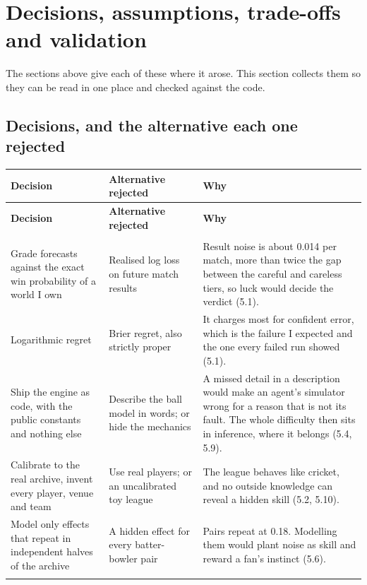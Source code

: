 \documentclass[11pt,letterpaper]{article}
\begin{document}
\section{Decisions, assumptions, trade-offs and validation}

The sections above give each of these where it arose. This section collects them so they can be read in one place and checked against the code.


\subsection{Decisions, and the alternative each one rejected}

\begin{small}
\begin{longtable}{>{\raggedright\arraybackslash}p{}>{\raggedright\arraybackslash}p{}>{\raggedright\arraybackslash}p{}}
\toprule
\textbf{Decision} & \textbf{Alternative rejected} & \textbf{Why} \\ \midrule
\endfirsthead
\toprule
\textbf{Decision} & \textbf{Alternative rejected} & \textbf{Why} \\ \midrule
\endhead
\midrule \multicolumn{3}{r}{\footnotesize continued on the next page} \\ \endfoot
\bottomrule \endlastfoot
Grade forecasts against the exact win probability of a world I own & Realised log loss on future match results & Result noise is about 0.014 per match, more than twice the gap between the careful and careless tiers, so luck would decide the verdict (5.1). \\ \addlinespace[2pt]
Logarithmic regret & Brier regret, also strictly proper & It charges most for confident error, which is the failure I expected and the one every failed run showed (5.1). \\ \addlinespace[2pt]
Ship the engine as code, with the public constants and nothing else & Describe the ball model in words; or hide the mechanics & A missed detail in a description would make an agent's simulator wrong for a reason that is not its fault. The whole difficulty then sits in inference, where it belongs (5.4, 5.9). \\ \addlinespace[2pt]
Calibrate to the real archive, invent every player, venue and team & Use real players; or an uncalibrated toy league & The league behaves like cricket, and no outside knowledge can reveal a hidden skill (5.2, 5.10). \\ \addlinespace[2pt]
Model only effects that repeat in independent halves of the archive & A hidden effect for every batter-bowler pair & Pairs repeat at 0.18. Modelling them would plant noise as skill and reward a fan's instinct (5.6). \\ \addlinespace[2pt]

\end{longtable}
\end{small}
\end{document}
